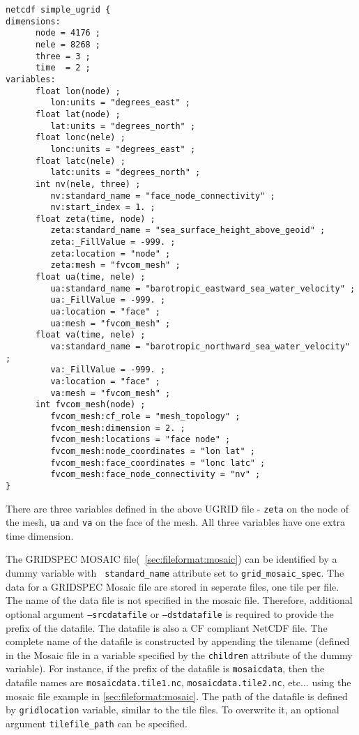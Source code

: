 \label{ugridexample}
\begin{verbatim}
netcdf simple_ugrid {
dimensions:
      node = 4176 ; 
      nele = 8268 ;
      three = 3 ;
      time  = 2 ;
variables:
      float lon(node) ;
         lon:units = "degrees_east" ;
      float lat(node) ;
         lat:units = "degrees_north" ;
      float lonc(nele) ;
         lonc:units = "degrees_east" ;
      float latc(nele) ;
         latc:units = "degrees_north" ;
      int nv(nele, three) ;
         nv:standard_name = "face_node_connectivity" ;
         nv:start_index = 1. ;
      float zeta(time, node) ;
         zeta:standard_name = "sea_surface_height_above_geoid" ;
         zeta:_FillValue = -999. ;
         zeta:location = "node" ;
         zeta:mesh = "fvcom_mesh" ;
      float ua(time, nele) ;
         ua:standard_name = "barotropic_eastward_sea_water_velocity" ;
         ua:_FillValue = -999. ;
         ua:location = "face" ;
         ua:mesh = "fvcom_mesh" ;
      float va(time, nele) ;
         va:standard_name = "barotropic_northward_sea_water_velocity" ;
         va:_FillValue = -999. ;
         va:location = "face" ;
         va:mesh = "fvcom_mesh" ;
      int fvcom_mesh(node) ;
         fvcom_mesh:cf_role = "mesh_topology" ;
         fvcom_mesh:dimension = 2. ;
         fvcom_mesh:locations = "face node" ;
         fvcom_mesh:node_coordinates = "lon lat" ;
         fvcom_mesh:face_coordinates = "lonc latc" ;
         fvcom_mesh:face_node_connectivity = "nv" ;
}
\end{verbatim}

There are three variables defined in the above UGRID file - {\tt zeta} on the node of the mesh, {\tt ua} and
{\tt va} on the face of the mesh.  All three variables have one extra time dimension.  

The GRIDSPEC MOSAIC file(~\ref{sec:fileformat:mosaic}) can be identified by a dummy variable with {\tt
  standard\_name} attribute set to {\tt grid\_mosaic\_spec}.  The data for a
GRIDSPEC Mosaic file are stored in seperate files, one tile per file.  The
name of the data file is not specified in the mosaic file.  Therefore,
additional optional argument {\tt --srcdatafile} or {\tt --dstdatafile} is
required to provide the prefix of the datafile.  The datafile is also a CF
compliant NetCDF file.  The complete name of the datafile is
constructed by appending the tilename (defined in the Mosaic file in a
variable specified by the {\tt children} attribute of the dummy variable).
For instance, if the prefix of the datafile is {\tt mosaicdata}, then the
datafile names are {\tt mosaicdata.tile1.nc}, {\tt mosaicdata.tile2.nc},
etc...  using the mosaic file example in \ref{sec:fileformat:mosaic}.  The
path of the datafile is defined by {\tt gridlocation} variable, similar to the
tile files.  To overwrite it, an optional argument {\tt tilefile_path} can be
specified.  

